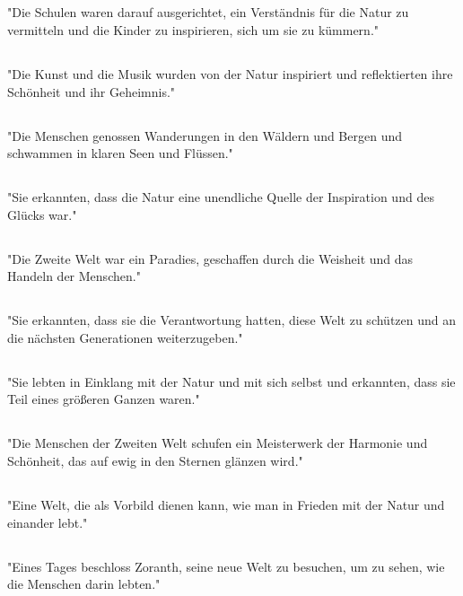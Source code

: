 \documentclass{article}
\begin{document}
\subsection{}
"Die Schulen waren darauf ausgerichtet, ein Verständnis für die Natur zu vermitteln und die Kinder zu inspirieren, sich um sie zu kümmern."
\subsection{}
"Die Kunst und die Musik wurden von der Natur inspiriert und reflektierten ihre Schönheit und ihr Geheimnis."
\subsection{}
"Die Menschen genossen Wanderungen in den Wäldern und Bergen und schwammen in klaren Seen und Flüssen."
\subsection{}
"Sie erkannten, dass die Natur eine unendliche Quelle der Inspiration und des Glücks war."
\subsection{}
"Die Zweite Welt war ein Paradies, geschaffen durch die Weisheit und das Handeln der Menschen."
\subsection{}
"Sie erkannten, dass sie die Verantwortung hatten, diese Welt zu schützen und an die nächsten Generationen weiterzugeben."
\subsection{}
"Sie lebten in Einklang mit der Natur und mit sich selbst und erkannten, dass sie Teil eines größeren Ganzen waren."
\subsection{}
"Die Menschen der Zweiten Welt schufen ein Meisterwerk der Harmonie und Schönheit, das auf ewig in den Sternen glänzen wird."
\subsection{}
"Eine Welt, die als Vorbild dienen kann, wie man in Frieden mit der Natur und einander lebt."
\subsection{}
"Eines Tages beschloss Zoranth, seine neue Welt zu besuchen, um zu sehen, wie die Menschen darin lebten."
\end{document}
